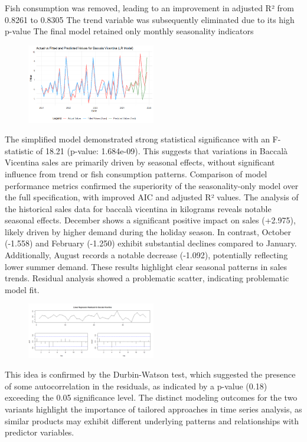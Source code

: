 \documentclass[10pt,twocolumn,letterpaper]{article}
\begin{document}
Fish consumption was removed, leading to an improvement in adjusted R² from 0.8261 to 0.8305
The trend variable was subsequently eliminated due to its high p-value
The final model retained only monthly seasonality indicators
\begin{figure}[H]
    \centering
    \includegraphics[width=0.5\textwidth]{PlotsBEFD/PRED_LR_VIC.png} 
    \caption{}
    \label{fig:esempio}
\end{figure}
The simplified model demonstrated strong statistical significance with an F-statistic of 18.21 (p-value: 1.684e-09). This suggests that variations in Baccalà Vicentina sales are primarily driven by seasonal effects, without significant influence from trend or fish consumption patterns.
Comparison of model performance metrics confirmed the superiority of the seasonality-only model over the full specification, with improved AIC and adjusted R² values. 
\newline
The analysis of the historical sales data for baccalà vicentina in kilograms reveals notable seasonal effects. December shows a significant positive impact on sales (+2.975), likely driven by higher demand during the holiday season. In contrast, October (-1.558) and February (-1.250) exhibit substantial declines compared to January. Additionally, August records a notable decrease (-1.092), potentially reflecting lower summer demand. These results highlight clear seasonal patterns in sales trends.
\newline
Residual analysis showed a problematic scatter, indicating problematic model fit. 
\begin{figure}[H]
    \centering
    \includegraphics[width=0.5\textwidth]{PlotsBEFD/RES_LR_VIC.png} 
    \caption{}
    \label{fig:esempio}
\end{figure}
This idea is confirmed by the Durbin-Watson test, which suggested the presence of some autocorrelation in the residuals, as indicated by a p-value (0.18) exceeding the 0.05 significance level.
The distinct modeling outcomes for the two variants highlight the importance of tailored approaches in time series analysis, as similar products may exhibit different underlying patterns and relationships with predictor variables.
\end{document}
